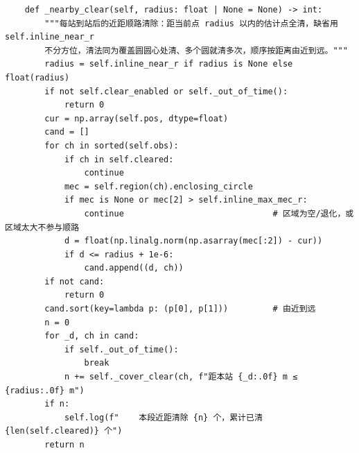 \documentclass[UTF8, zihao=5,AutoFakeBold=2]{ctexart}
\begin{document}
\begin{lstlisting}
    def _nearby_clear(self, radius: float | None = None) -> int:
        """每站到站后的近距顺路清除：距当前点 radius 以内的估计点全清，缺省用 self.inline_near_r
        不分方位，清法同为覆盖圆圆心处清、多个圆就清多次，顺序按距离由近到远。"""
        radius = self.inline_near_r if radius is None else float(radius)
        if not self.clear_enabled or self._out_of_time():
            return 0
        cur = np.array(self.pos, dtype=float)
        cand = []
        for ch in sorted(self.obs):
            if ch in self.cleared:
                continue
            mec = self.region(ch).enclosing_circle
            if mec is None or mec[2] > self.inline_max_mec_r:
                continue                              # 区域为空/退化，或区域太大不参与顺路
            d = float(np.linalg.norm(np.asarray(mec[:2]) - cur))
            if d <= radius + 1e-6:
                cand.append((d, ch))
        if not cand:
            return 0
        cand.sort(key=lambda p: (p[0], p[1]))         # 由近到远
        n = 0
        for _d, ch in cand:
            if self._out_of_time():
                break
            n += self._cover_clear(ch, f"距本站 {_d:.0f} m ≤ {radius:.0f} m")
        if n:
            self.log(f"    本段近距清除 {n} 个，累计已清 {len(self.cleared)} 个")
        return n


\end{lstlisting}
\end{document}
